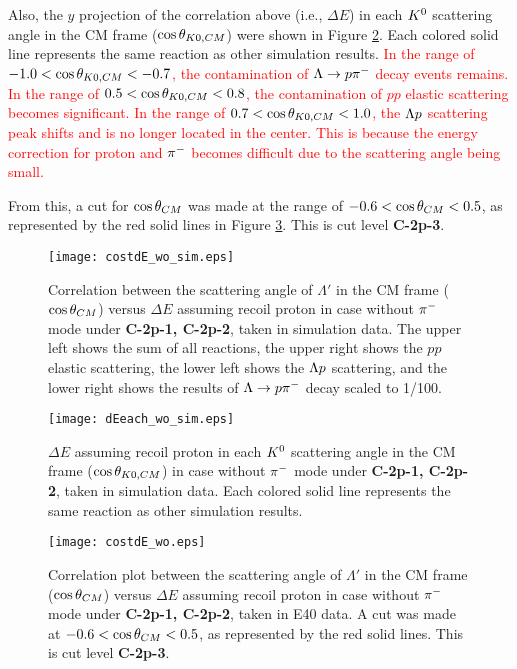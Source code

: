 Also, the $y$ projection of the correlation above (i.e., $\Delta E$) in each $K^{0}$ scattering angle in the CM frame ($\cos{\theta_{K0,CM}}$) were shown in Figure \ref{fig-dEeach_sim}. 
Each colored solid line represents the same reaction as other simulation results.
\textcolor{red}{ In the range of $-1.0<\cos{\theta_{K0,CM}}<-0.7$, the contamination of $\Lambda\to p\pi^{-}$ decay events remains. In the range of $0.5<\cos{\theta_{K0,CM}}<0.8$, the contamination of $pp$ elastic scattering becomes significant. In the range of $0.7<\cos{\theta_{K0,CM}}<1.0$, the $\Lambda p$ scattering peak shifts and is no longer located in the center. This is because the energy correction for proton and $\pi^{-}$ becomes difficult due to the scattering angle being small. }

From this, a cut for $\cos{\theta}_{CM}$ was made at the range of $-0.6<\cos{\theta}_{CM}<0.5$, as represented by the red solid lines in Figure \ref{fig-costdE}. This is cut level {\bf C-2p-3}.

\begin{figure}[!h]
  \begin{center}
    \texttt{[image: costdE\_wo\_sim.eps]}
    \caption{Correlation between the scattering angle of $\Lambda'$ in the CM frame ($\cos{\theta}_{CM}$) versus $\Delta E$ assuming recoil proton in case  without $\pi^{-}$ mode under {\bf C-2p-1, C-2p-2}, taken in simulation data. The upper left shows the sum of all reactions, the upper right shows the $pp$ elastic scattering, the lower left shows the $\Lambda p$ scattering, and the lower right shows the results of $\Lambda\to p\pi^{-}$ decay scaled to 1/100.}
    \label{fig-costdE_sim}
  \end{center}
\end{figure}

\begin{figure}[!h]
  \begin{center}
    \texttt{[image: dEeach\_wo\_sim.eps]}
    \caption{$\Delta E$ assuming recoil proton in each $K^{0}$ scattering angle in the CM frame ($\cos{\theta_{K0,CM}}$) in case  without $\pi^{-}$ mode under {\bf C-2p-1, C-2p-2}, taken in simulation data. Each colored solid line represents the same reaction as other simulation results.}
    \label{fig-dEeach_sim}
  \end{center}
\end{figure}

\begin{figure}[!h]
  \begin{center}
    \texttt{[image: costdE\_wo.eps]}
    \caption{Correlation plot between the scattering angle of $\Lambda'$ in the CM frame ($\cos{\theta}_{CM}$) versus $\Delta E$ assuming recoil proton in case  without $\pi^{-}$ mode under {\bf C-2p-1, C-2p-2}, taken in E40 data. A cut was made at $-0.6<\cos{\theta}_{CM}<0.5$, as represented by the red solid lines. This is cut level {\bf C-2p-3}.}
    \label{fig-costdE}
  \end{center}
\end{figure}


